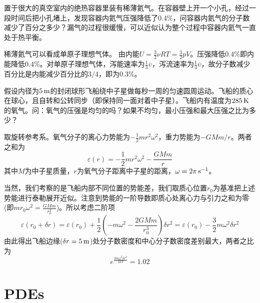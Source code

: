 \documentclass[CJK]{beamer}
\begin{document}
\begin{frame}
  \chtitle{\proid (\sfour)}
  \bch
  置于很大的真空室内的绝热容器里装有稀薄氦气。在容器壁上开一个小孔，经过一段时间后把小孔堵上，发现容器内氦气压强降低了$0.4\%$，问容器内氦气的分子数减少了百分之多少？漏气的过程很缓慢，可以近似认为整个过程中容器内氦气一直处于热平衡。
  \ech
\end{frame}

\begin{frame}
  \bch
        稀薄氦气可以看成单原子理想气体。
        由内能$U = \frac{3}{2}\nu RT = \frac{3}{2}pV$。压强降低$0.4\%$即内能降低$0.4\%$。对单原子理想气体，泻能速率为$\frac{1}{3}\overline{\upsilon}$，泻流速率为$\frac{1}{4}\overline{\upsilon}$，故分子数减少百分比是内能减少百分比的$3/4$，即为$0.3\%$。        
  \ech
\end{frame}

\begin{frame}
  \chtitle{\proid (\sfour)}
  \bch
  假设内径为$5\,\mathrm{m}$的封闭球形飞船绕中子星做每秒一周的匀速圆周运动。飞船的质心在球心，且自转和公转同步（即保持同一面对着中子星）。飞船内有温度为$285\,\mathrm{K}$的氧气。问：氧气的压强是均匀的吗？如果不均匀，最小压强和最大压强之比为多少？
  \ech
\end{frame}

\begin{frame}
  \bch
  {\small
  取旋转参考系。氧气分子的离心力势能为$-\frac{1}{2}mr^2\omega^2$，重力势能为$-GMm/r$。两者之和为
  $$\varepsilon(r) = -\frac{1}{2}mr^2\omega^2 -\frac{GMm}{r}$$
  其中$M$为中子星质量，$r$为氧气分子距离中子星的距离，$\omega = 2\pi \,\mathrm{s}^{-1}$。
  
  当然，我们考察的是飞船内部不同位置的势能差，我们取质心位置$r_0$为基准把上述势能进行泰勒展开近似。注意到势能的一阶导数即质心处离心力与引力之和为零(即$mr_0\omega^2 = \frac{GMm}{r_0^2}$)。所以考虑二阶项
  $$\varepsilon(r_0+\delta r) = \varepsilon(r_0) + \frac{1}{2}\left(-m\omega^2 -\frac{2GMm}{r_0^3}\right)\delta r^2 =  \varepsilon(r_0) - \frac{3}{2}m\omega^2\delta r^2 $$
  由此得出飞船边缘($\delta r = 5\,\mathrm{m}$)处分子数密度和中心分子数密度差别最大，两者之比为
  $$e^{\frac{3m \omega^2\delta r^2}{2kT}}= 1.02 $$
    }
  \ech
\end{frame}


\section{PDEs}
\setcounter{chap}{3}
\setcounter{problem}{0}
\end{document}

